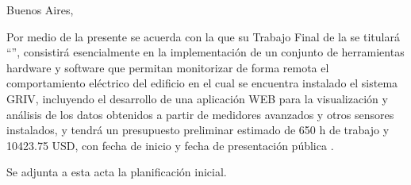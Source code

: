 \documentclass[
11pt, %
codirector, %
]{charter}
\begin{document}
\begin{flushright}
Buenos Aires, \fechaInicioName
\end{flushright}

\vspace{2cm}

Por medio de la presente se acuerda con la \authorname\hspace{1px} que su Trabajo Final de la \degreename\hspace{1px} se titulará ``\ttitle'', consistirá esencialmente en la implementación de un conjunto de herramientas hardware y software que permitan monitorizar de forma remota el comportamiento eléctrico del edificio en el cual se encuentra instalado el sistema GRIV, incluyendo el desarrollo de una aplicación WEB para la visualización y análisis de los datos obtenidos a partir de medidores avanzados y otros sensores instalados, y tendrá un presupuesto preliminar estimado de 650 h de trabajo y 10423.75 USD, con fecha de inicio \fechaInicioName\hspace{1px} y fecha de presentación pública \fechaFinalName.

Se adjunta a esta acta la planificación inicial.

\vfill
\end{document}
